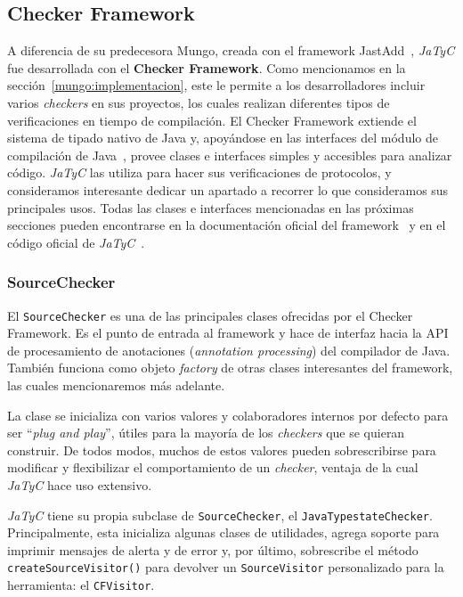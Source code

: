 \subsection{Checker Framework}
\label{checker-framework}

A diferencia de su predecesora Mungo, creada con el framework JastAdd~\cite{jastadd:website}, \textit{JaTyC} fue desarrollada con el \textbf{Checker Framework}. Como mencionamos en la sección~\ref{mungo:implementacion}, este le permite a los desarrolladores incluir varios \textit{checkers} en sus proyectos, los cuales realizan diferentes tipos de verificaciones en tiempo de compilación. El Checker Framework extiende el sistema de tipado nativo de Java y, apoyándose en las interfaces del módulo de compilación de Java~\cite{java-docs:javac-module}, provee clases e interfaces simples y accesibles para analizar código. \textit{JaTyC} las utiliza para hacer sus verificaciones de protocolos, y consideramos interesante dedicar un apartado a recorrer lo que consideramos sus principales usos. Todas las clases e interfaces mencionadas en las próximas secciones pueden encontrarse en la documentación oficial del framework~\cite{checker-framework-docs} y en el código oficial de \textit{JaTyC}~\cite{jatyc:github}.

\subsubsection{SourceChecker}

El \texttt{SourceChecker} es una de las principales clases ofrecidas por el Checker Framework. Es el punto de entrada al framework y hace de interfaz hacia la API de procesamiento de anotaciones (\textit{annotation processing}) del compilador de Java. También funciona como objeto \textit{factory} de otras clases interesantes del framework, las cuales mencionaremos más adelante.

La clase se inicializa con varios valores y colaboradores internos por defecto para ser ``\textit{plug and play}'', útiles para la mayoría de los \textit{checkers} que se quieran construir. De todos modos, muchos de estos valores pueden sobrescribirse para modificar y flexibilizar el comportamiento de un \textit{checker}, ventaja de la cual \textit{JaTyC} hace uso extensivo.

\textit{JaTyC} tiene su propia subclase de \texttt{SourceChecker}, el \texttt{JavaTypestateChecker}. Principalmente, esta inicializa algunas clases de utilidades, agrega soporte para imprimir mensajes de alerta y de error y, por último, sobrescribe el método \texttt{createSourceVisitor()} para devolver un \texttt{SourceVisitor} personalizado para la herramienta: el \texttt{CFVisitor}.

